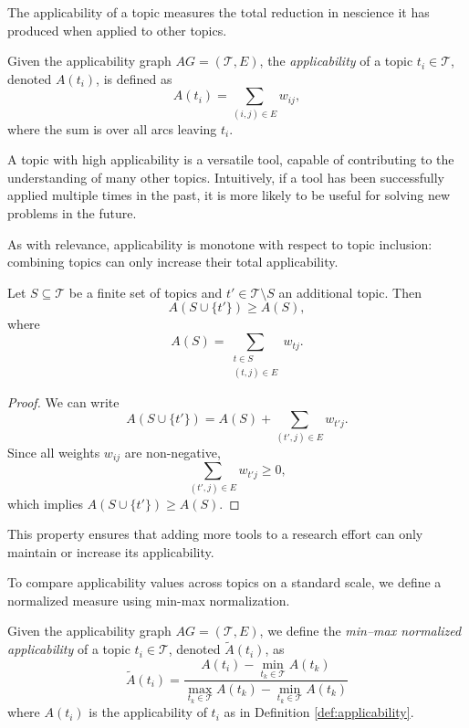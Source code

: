 The applicability of a topic measures the total reduction in nescience it has produced when applied to other topics.

\begin{definition}
\label{def:applicability}
Given the applicability graph $AG = (\mathcal{T}, E)$, the \emph{applicability} of a topic $t_i \in \mathcal{T}$, denoted $A(t_i)$, is defined as
\[
A(t_i) = \sum_{(i,j) \in E} w_{ij},
\]
where the sum is over all arcs leaving $t_i$.
\end{definition}

A topic with high applicability is a versatile tool, capable of contributing to the understanding of many other topics. Intuitively, if a tool has been successfully applied multiple times in the past, it is more likely to be useful for solving new problems in the future.

As with relevance, applicability is monotone with respect to topic inclusion: combining topics can only increase their total applicability.

\begin{proposition}
\label{prop:nondecreasing_applicability}
Let $S \subseteq \mathcal{T}$ be a finite set of topics and $t' \in \mathcal{T} \setminus S$ an additional topic. Then
\[
A(S \cup \{t'\}) \geq A(S),
\]
where
\[
A(S) = \sum_{\substack{t \in S \\ (t,j) \in E}} w_{tj}.
\]
\end{proposition}
\begin{proof}
We can write
\[
A(S \cup \{t'\}) = A(S) + \sum_{(t',j) \in E} w_{t'j}.
\]
Since all weights $w_{ij}$ are non-negative,
\[
\sum_{(t',j) \in E} w_{t'j} \geq 0,
\]
which implies $A(S \cup \{t'\}) \geq A(S)$.
\end{proof}

This property ensures that adding more tools to a research effort can only maintain or increase its applicability.

To compare applicability values across topics on a standard scale, we define a normalized measure using min-max normalization.

\begin{definition}
\label{def:normalized-applicability}
Given the applicability graph $AG = (\mathcal{T}, E)$, we define the \emph{min–max normalized applicability} of a topic $t_i \in \mathcal{T}$, denoted $\tilde{A}(t_i)$, as
\[
\tilde{A}(t_i) =
\frac{A(t_i) - \min_{t_k \in \mathcal{T}} A(t_k)}
     {\max_{t_k \in \mathcal{T}} A(t_k) - \min_{t_k \in \mathcal{T}} A(t_k)}
\]
where $A(t_i)$ is the applicability of $t_i$ as in Definition \ref{def:applicability}.
\end{definition}

